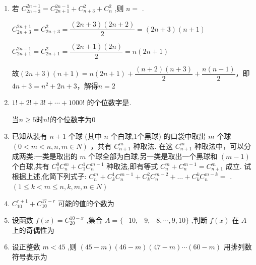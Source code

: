 \begin{enumerate}
    \item 若 ${C}_{{2n} + 3}^{{2n} + 1} = {C}_{{2n} + 1}^{{2n} - 1} + {C}_{n + 3}^{2} + {C}_{n}^{2}$ ,则 $n =$ .
    \begin{jieda}
        ${C}_{{2n} + 3}^{{2n} + 1} = {C}_{{2n} + 3}^{2} = \dfrac{(2n+3)(2n+2)}{2} = (2n+3)(n+1)$

        ${C}_{{2n} + 1}^{{2n} - 1} = {C}_{{2n} + 1}^{2} = \dfrac{(2n+1)(2n)}{2} = n(2n+1)$

        故$(2n+3)(n+1) = n(2n+1) + \dfrac{(n+2)(n+3)}{2} + \dfrac{n(n-1)}{2}$，即$4n+3 = n^2+2n+3$，解得$n = 2$
    \end{jieda}

    \item $1! + 2! + 3! + \cdots  + {1000}!$ 的个位数字是.
    \begin{jieda}
        当$n \geq 5$时$n!$的个位数字为0
    \end{jieda}

    \item 已知从装有 $n + 1$ 个球 (其中 $n$ 个白球,1个黑球) 的口袋中取出 $m$ 个球 $\left( {0 < m < n,n,m \in  N}\right)$ ，共有 ${C}_{n + 1}^{m}$ 种取法. 在这 ${C}_{n + 1}^{m}$ 种取法中，可以分成两类:一类是取出的 $m$ 个球全部为白球,另一类是取出一个黑球和 $\left( {m - 1}\right)$ 个白球,共有 ${C}_{1}^{0}{C}_{n}^{m} + {C}_{1}^{1}{C}_{n}^{m - 1}$ 种取法,即有等式 ${C}_{n}^{m} + {C}_{n}^{m - 1} = {C}_{n + 1}^{m}$ 成立. 试根据上述,化简下列式子: ${C}_{n}^{m} + {C}_{k}^{1}{C}_{n}^{m - 1} + {C}_{k}^{2}{C}_{n}^{m - 2} + \ldots  + {C}_{k}^{k}{C}_{n}^{m - k} =$ . $\left( {1 \leq  k < m \leq  n,k,m,n \in  N}\right)$ 
    
    \item ${C}_{10}^{r + 1} + {C}_{10}^{{17} - r}$ 可能的值的个数为
    
    \item 设函数 $f\left( x\right)  = {C}_{20}^{{10} - x}$ ,集合 $A = \{  - {10}, - 9, - 8,\cdots ,9,{10}\}$ ,判断 $f\left( x\right)$ 在 $A$ 上的奇偶性为
    
    \item 设正整数 $m < {45}$ ,则 $\left( {{45} - m}\right) \left( {{46} - m}\right) \left( {{47} - m}\right) \cdots \left( {{60} - m}\right)$ 用排列数符号表示为
    

\end{enumerate}
